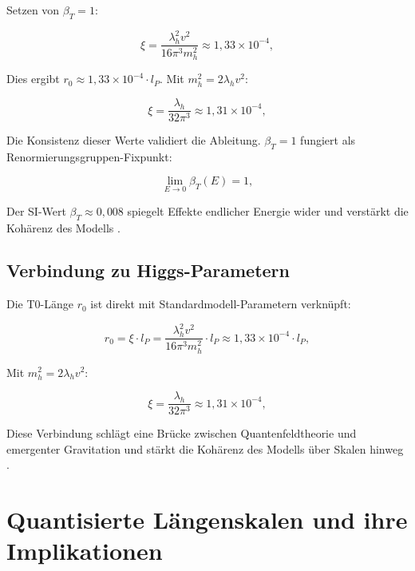 \documentclass[twocolumn,aps,prl]{revtex4-2}
\begin{document}
	Setzen von $\beta_T = 1$:
	
	\begin{equation}
		\xi = \frac{\lambda_h^2 v^2}{16 \pi^3 m_h^2} \approx 1,33 \times 10^{-4}, \label{eq:xi_value}
	\end{equation}
	
	Dies ergibt $r_0 \approx 1,33 \times 10^{-4} \cdot l_P$. Mit $m_h^2 = 2 \lambda_h v^2$:
	
	\begin{equation}
		\xi = \frac{\lambda_h}{32 \pi^3} \approx 1,31 \times 10^{-4}, \label{eq:xi_alt}
	\end{equation}
	
	Die Konsistenz dieser Werte validiert die Ableitung. $\beta_T = 1$ fungiert als Renormierungsgruppen-Fixpunkt:
	
	\begin{equation}
		\lim_{E \to 0} \beta_T(E) = 1, \label{eq:beta_limit}
	\end{equation}
	
	Der SI-Wert $\beta_T \approx 0,008$ spiegelt Effekte endlicher Energie wider und verstärkt die Kohärenz des Modells \cite{pascher_beta_2025}.
	
	\subsection{Verbindung zu Higgs-Parametern}
	\label{subsec:higgs}
	
	Die T0-Länge $r_0$ ist direkt mit Standardmodell-Parametern verknüpft:
	
	\begin{equation}
		r_0 = \xi \cdot l_P = \frac{\lambda_h^2 v^2}{16 \pi^3 m_h^2} \cdot l_P \approx 1,33 \times 10^{-4} \cdot l_P, \label{eq:r0_higgs}
	\end{equation}
	
	Mit $m_h^2 = 2 \lambda_h v^2$:
	
	\begin{equation}
		\xi = \frac{\lambda_h}{32 \pi^3} \approx 1,31 \times 10^{-4}, \label{eq:xi_higgs}
	\end{equation}
	
	Diese Verbindung schlägt eine Brücke zwischen Quantenfeldtheorie und emergenter Gravitation und stärkt die Kohärenz des Modells über Skalen hinweg \cite{pascher_higgs_2025}.
	
	\section{Quantisierte Längenskalen und ihre Implikationen}
	\label{sec:length_scales}
	
\end{document}
